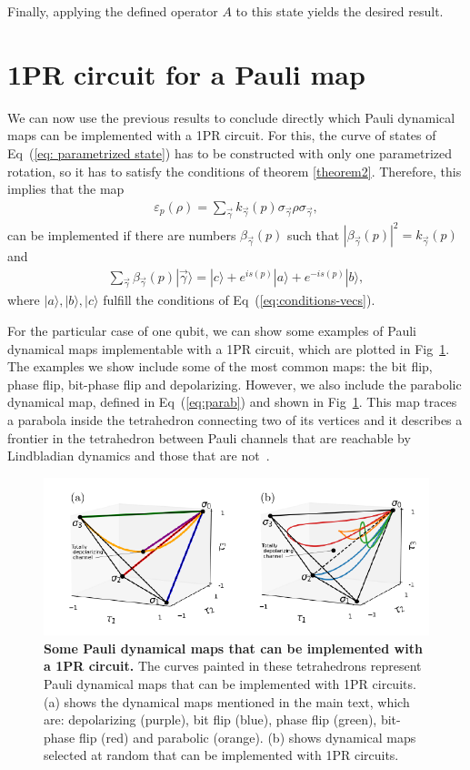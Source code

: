 \documentclass[10pt,letterpaper]{article} %
\newcommand{\fref}[1]{Fig~\ref{#1}}
\newcommand{\eref}[1]{Eq~(\ref{#1})}
\begin{document}
Finally, applying the defined operator $A$ to this state yields the desired result.
 
\section{1PR circuit for a Pauli map} %
\label{sec: 1PR circuit for a Pauli map}

We can now use the previous results to conclude directly which Pauli dynamical maps
can be implemented with a 1PR circuit.
For this, the curve of states of \eref{eq: parametrized state} 
has to be constructed with only one parametrized rotation,
so it has to satisfy the conditions of theorem \ref{theorem2}.
Therefore, this implies that the map
\begin{eqnarray}
\varepsilon_p(\rho) = \sum_{\vec{\gamma}} k_{\vec{\gamma}}(p) \sigma_{\vec{\gamma}} \rho \sigma_{\vec{\gamma}},
\end{eqnarray}
can be implemented  if there are numbers $\beta_{\vec{\gamma}}(p)$ such that $|\beta_{\vec{\gamma}}(p)|^2 = k_{\vec{\gamma}}(p)$ and
\begin{eqnarray}
\label{eq:vec}
\sum_{\vec{\gamma}} \beta_{\vec{\gamma}}(p) |\vec{\gamma}\rangle = |c\rangle +  e^{is(p)} |a\rangle + e^{-is(p)}|b\rangle,
\end{eqnarray}
where $|a\rangle,|b\rangle,|c\rangle$ fulfill
the conditions of \eref{eq:conditions-vecs}.

For the particular case of one qubit, we can show some examples of Pauli
dynamical maps implementable with a 1PR circuit, which are plotted in
\fref{Fig5}. 
The examples we show include some of the most common maps: the bit flip, phase flip, bit-phase flip and depolarizing.
However, we also include the parabolic dynamical map,
defined in \eref{eq:parab} and shown in \fref{Fig5}.
This map traces a parabola inside the tetrahedron connecting two of its vertices
and it describes a frontier in the tetrahedron between Pauli channels
that are reachable by Lindbladian dynamics and those that are not~\cite{Davalos}.

\begin{figure} %
\centering
\includegraphics{images/fig-curves.pdf}
\caption{{\bf Some Pauli dynamical maps that can be implemented with a 1PR circuit.}
The curves painted in these tetrahedrons
represent Pauli dynamical maps that can be implemented with 1PR circuits.
(a) shows the dynamical maps mentioned in the main 
text, which are: depolarizing (purple), bit flip (blue),
phase flip (green), bit-phase flip (red)
and parabolic (orange).
(b) shows dynamical maps selected at random that can be implemented with 1PR 
circuits.}
\label{Fig5}
\end{figure} %
\end{document}
